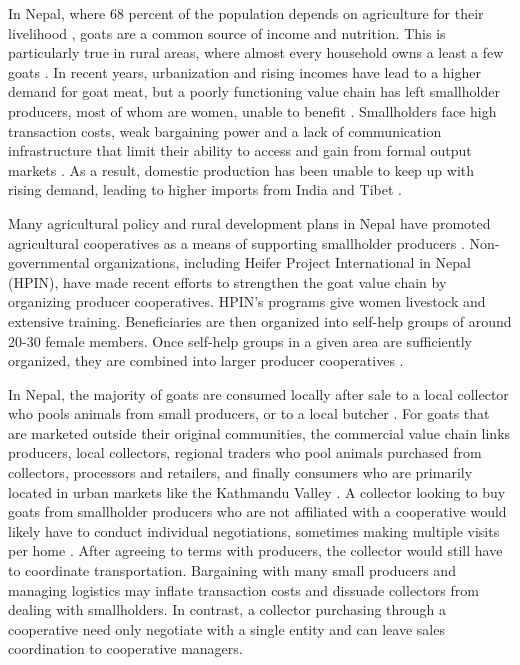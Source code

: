 \documentclass[11pt]{article}
\begin{document}
In Nepal, where 68 percent of the population depends on agriculture for their livelihood %
\citep{international_labor_organization_ilo_2016}, goats are a common source of income and nutrition. This is particularly true in rural areas, where almost every household owns a least a few goats \citep{upreti_food_2009}. In recent years, urbanization and rising incomes have lead to a higher demand for goat meat, but a poorly functioning value chain has left smallholder producers, most of whom are women, unable to benefit \citep{ashby_investing_nodate,choudhary_pro-poor_2011,gurung_empowering_2015}. Smallholders face high transaction costs, weak bargaining power and a lack of communication infrastructure that limit their ability to access and gain from formal output markets \citep{ashby_investing_nodate,p_kristjanson_notitle_2014}. As a result, domestic production has been unable to keep up with rising demand, leading to higher imports from India and Tibet \citep{heifer_international_nepal_study_2012}.

Many agricultural policy and rural development plans in Nepal have promoted agricultural cooperatives as a means of supporting smallholder producers \citep{agricultural_development_strategy_agricultural_2015}. Non-governmental organizations, including Heifer Project International in Nepal (HPIN), have made recent efforts to strengthen the goat value chain by organizing producer cooperatives. HPIN’s programs give women livestock and extensive training. Beneficiaries are then organized into self-help groups of around 20-30 female members. Once self-help groups in a given area are sufficiently organized, they are combined into larger producer cooperatives \citep{janzen_short-term_2018}.

In Nepal, the majority of goats are consumed locally after sale to a local collector who pools animals from small producers, or to a local butcher \citep{heifer_international_nepal_study_2012}. For goats that are marketed outside their original communities, the commercial value chain links producers, local collectors, regional traders who pool animals purchased from collectors, processors and retailers, and finally consumers who are primarily located in urban markets like the Kathmandu Valley \citep{heifer_international_nepal_study_2012}. A collector looking to buy goats from smallholder producers who are not affiliated with a cooperative would likely have to conduct individual negotiations, sometimes making multiple visits per home \citep{heifer_international_nepal_study_2012, staal_smallholder_1997}. After agreeing to terms with producers, the collector would still have to coordinate transportation. Bargaining with many small producers and managing logistics may inflate transaction costs and dissuade collectors from dealing with smallholders. In contrast, a collector purchasing through a cooperative need only negotiate with a single entity and can leave sales coordination to cooperative managers. 
\end{document}

